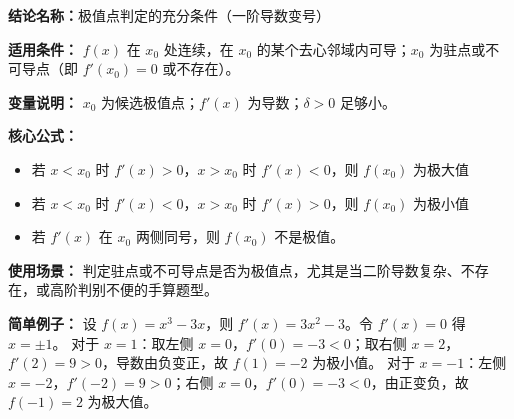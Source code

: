 \textbf{结论名称：}极值点判定的充分条件（一阶导数变号）

\textbf{适用条件：} $f(x)$ 在 $x_0$ 处连续，在 $x_0$ 的某个去心邻域内可导；$x_0$ 为驻点或不可导点（即 $f'(x_0)=0$ 或不存在）。

\textbf{变量说明：} $x_0$ 为候选极值点；$f'(x)$ 为导数；$\delta>0$ 足够小。

\textbf{核心公式：}
\begin{itemize}
  \item 若 $x<x_0$ 时 $f'(x)>0$，$x>x_0$ 时 $f'(x)<0$，则 $\boxed{f(x_0)\text{ 为极大值}}$
  \item 若 $x<x_0$ 时 $f'(x)<0$，$x>x_0$ 时 $f'(x)>0$，则 $\boxed{f(x_0)\text{ 为极小值}}$
  \item 若 $f'(x)$ 在 $x_0$ 两侧同号，则 $f(x_0)$ 不是极值。
\end{itemize}

\textbf{使用场景：} 判定驻点或不可导点是否为极值点，尤其是当二阶导数复杂、不存在，或高阶判别不便的手算题型。

\textbf{简单例子：} 设 $f(x)=x^3-3x$，则 $f'(x)=3x^2-3$。令 $f'(x)=0$ 得 $x=\pm1$。
对于 $x=1$：取左侧 $x=0$，$f'(0)=-3<0$；取右侧 $x=2$，$f'(2)=9>0$，导数由负变正，故 $f(1)=-2$ 为极小值。
对于 $x=-1$：左侧 $x=-2$，$f'(-2)=9>0$；右侧 $x=0$，$f'(0)=-3<0$，由正变负，故 $f(-1)=2$ 为极大值。